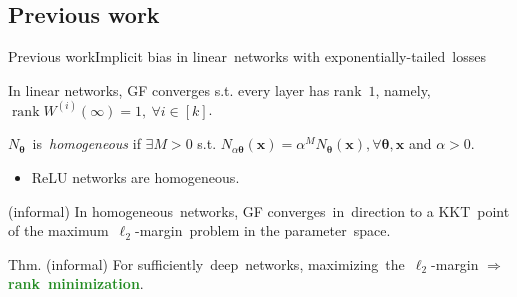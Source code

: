 \documentclass[handout,usenames,dvipsnames]{beamer} %
\DeclareMathOperator{\rank}{rank}
\newcommand{\bx}{\mathbf{x}}
\newcommand{\btheta}{{\boldsymbol{\theta}}}
\newcommand{\true}[1]{{\textcolor{ForestGreen}{\textbf{#1}}}}
\begin{document}
\subsection{Previous work}
\begin{frame}{Previous work}{Implicit bias in linear~networks with exponentially-tailed~losses}
    \pause
    \begin{exampleblock}{\cite{ji2018gradient, ji2020directional} \hfill\checkmark}
        In linear networks, GF converges s.t. every layer has rank~$1$, namely, $\rank W^{(i)}(\infty) = 1, ~\forall i \in [k]$.
    \end{exampleblock}
    \pause
    \begin{definition}
        $N_\btheta$~is~\emph{homogeneous} if $\exists M > 0$ s.t. $N_{\alpha \btheta}(\bx) = \alpha^M N_\btheta(\bx), \forall \btheta,\bx$ and $\alpha>0$.
    \end{definition}
    \pause
    \begin{itemize}
        \item ReLU networks are homogeneous.
    \end{itemize}
    \pause
    \begin{exampleblock}{\cite{lyu2019gradient,ji2020directional} (informal) \hfill\checkmark}
          In homogeneous~networks, GF converges~in~direction to a KKT~point of the maximum~$\ell_2$-margin~problem in the parameter~space.
    \end{exampleblock}
    \pause
    \begin{exampleblock}{Thm. (informal)}
        For sufficiently~deep~networks, maximizing~the~$\ell_2$-margin $\Rightarrow$ \true{rank~minimization}.
    \end{exampleblock}
    

\end{frame}
\end{document}
